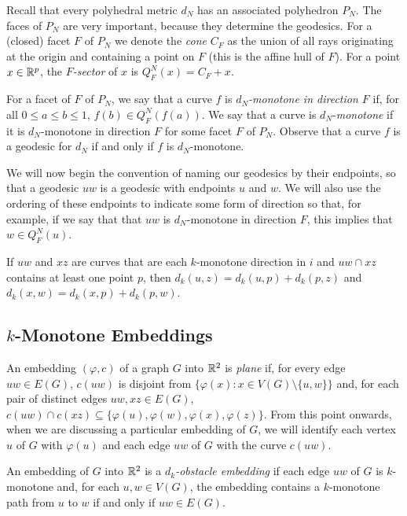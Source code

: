 \documentclass{patmorin}
\begin{document}
Recall that every polyhedral metric $d_N$ has an associated polyhedron
$P_N$.  The faces of $P_N$ are very important, because they determine the
geodesics.  For a (closed) facet $F$ of $P_N$ we denote the \emph{cone}
$C_F$ as the union of all rays originating at the origin and containing
a point on $F$ (this is the affine hull of $F$).  For a point $x\in\mathbb{R}^p$,
the \emph{$F$-sector} of $x$ is $Q^N_F(x)=C_F+x$.

For a facet of $F$ of $P_N$, we say that a curve $f$ is
\emph{$d_N$-monotone in direction $F$} if, for all $0\le a\le b\le 1$,
$f(b)\in Q^N_F(f(a))$.  We say that a curve is $d_N$-\emph{monotone} if it
is $d_N$-monotone in direction $F$ for some facet $F$ of $P_N$.  Observe
that a curve $f$ is a geodesic for $d_N$ if and only if $f$ is $d_N$-monotone.

We will now begin the convention of naming our geodesics by their
endpoints, so that a geodesic $uw$ is a geodesic with endpoints $u$
and $w$. We will also use the ordering of these endpoints to indicate
some form of direction so that, for example, if we say that that $uw$
is $d_N$-monotone in direction $F$, this implies that $w\in Q^N_F(u)$.

\begin{obs}
   If $uw$ and $xz$ are curves that are each $k$-monotone direction in $i$
   and $uw\cap xz$ contains at least one point $p$, then $d_k(u,z) =
   d_k(u,p)+d_k(p,z)$ and $d_k(x,w)=d_k(x,p)+d_k(p,w)$.
\end{obs}

\subsection{$k$-Monotone Embeddings}

An embedding $(\varphi,c)$ of a graph $G$ into $\mathbb{R}^2$
is \emph{plane} if, for every edge $uw\in E(G)$, $c(uw)$
is disjoint from $\{\varphi(x) : x\in V(G)\setminus\{u,w\}\}$
and, for each pair of distinct edges $uw,xz\in E(G)$, $c(uw)\cap
c(xz)\subseteq\{\varphi(u),\varphi(w),\varphi(x),\varphi(z)\}$. 
From this point onwards, when we are discussing a particular embedding
of $G$, we will identify each vertex $u$ of $G$ with $\varphi(u)$ and
each edge $uw$ of $G$ with the curve $c(uw)$.

\begin{defn}
An embedding of $G$ into $\mathbb{R}^2$ is a \emph{$d_k$-obstacle embedding}
if each edge $uw$ of $G$ is $k$-monotone and, for each $u,w\in V(G)$,
the embedding contains a $k$-monotone path from $u$ to $w$ if and only
if $uw\in E(G)$.
\end{defn}
\end{document}
